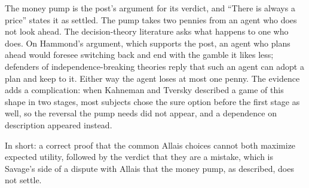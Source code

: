 \begin{afterword}
The money pump is the post's argument for its verdict, and ``There is always a price'' states it as settled. The pump takes two pennies from an agent who does not look ahead. The decision-theory literature asks what happens to one who does. On Hammond's argument, which supports the post, an agent who plans ahead would foresee switching back and end with the gamble it likes less; defenders of independence-breaking theories reply that such an agent can adopt a plan and keep to it. Either way the agent loses at most one penny. The evidence adds a complication: when Kahneman and Tversky described a game of this shape in two stages, most subjects chose the sure option before the first stage as well, so the reversal the pump needs did not appear, and a dependence on description appeared instead.

In short: a correct proof that the common Allais choices cannot both maximize expected utility, followed by the verdict that they are a mistake, which is Savage's side of a dispute with Allais that the money pump, as described, does not settle.
\end{afterword}

